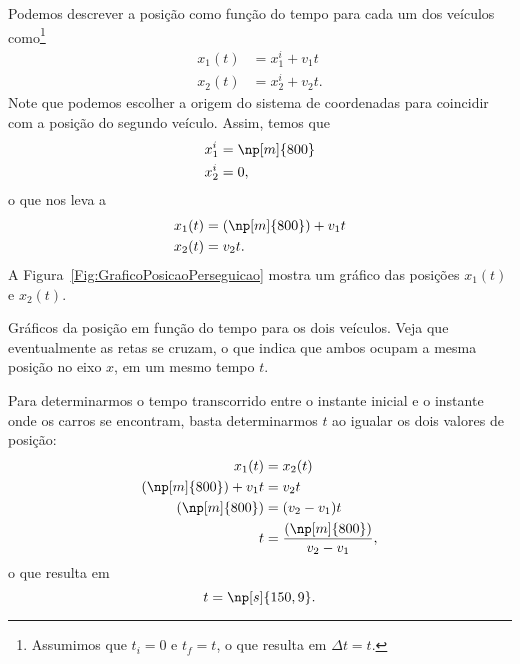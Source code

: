 Podemos descrever a posição como função do tempo para cada um dos veículos como\footnote{Assumimos que $t_i = 0$ e $t_f = t$, o que resulta em $\Delta t = t$.}
\begin{align}
	x_1(t) &= x_1^i + v_1 t \\
	x_2(t) &= x_2^i + v_2 t.
\end{align}
%
Note que podemos escolher a origem do sistema de coordenadas para coincidir com a posição do segundo veículo. Assim, temos que
\begin{align}
	x_1^i &= \np[m]{800} \\
	x_2^i &= 0,
\end{align}
%
o que nos leva a
\begin{align}
	x_1(t) &= (\np[m]{800}) + v_1 t \\
	x_2(t) &= v_2 t.
\end{align}
%
A Figura~\ref{Fig:GraficoPosicaoPerseguicao} mostra um gráfico das posições $x_1(t)$ e $x_2(t)$.

\begin{marginfigure}
\centering
{}
\caption{Gráficos da posição em função do tempo para os dois veículos. Veja que eventualmente as retas se cruzam, o que indica que ambos ocupam a mesma posição no eixo $x$, em um mesmo tempo $t$.\label{Fig:GraficoPosicaoPerseguicao}}
\end{marginfigure}

Para determinarmos o tempo transcorrido entre o instante inicial e o instante onde os carros se encontram, basta determinarmos $t$ ao igualar os dois valores de posição:
\begin{align}
	x_1(t) &= x_2(t) \\
	(\np[m]{800}) + v_1 t &= v_2 t \\
	(\np[m]{800}) &= (v_2 - v_1) t \\
	t &= \frac{(\np[m]{800})}{v_2-v_1},
\end{align}
%
o que resulta em
\begin{equation}
	t = \np[s]{150,9}.
\end{equation}


